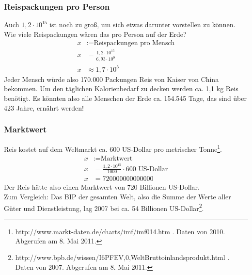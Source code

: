 \documentclass[a4paper,9pt]{scrartcl}
\begin{document}
  \subsubsection{Reispackungen pro Person}
    Auch $1,2 \cdot 10^{15}$ ist noch zu groß, um sich etwas darunter vorstellen
    zu können.\\
    Wie viele Reispackungen wären das pro Person auf der Erde?\\
    \begin{align}
        x &:= \text{Reispackungen pro Mensch} \\
        x &= \frac{1,2 \cdot 10^{15}}{6,93 \cdot 10^9} \\
        x &\approx 1,7 \cdot 10^5
    \end{align}
    Jeder Mensch würde also 170.000 Packungen Reis von Kaiser von China bekommen.
    Um den täglichen Kalorienbedarf zu decken werden ca. 1,1 kg Reis benötigt.
    Es könnten also alle Menschen der Erde ca. 154.545 Tage, das sind über 423
    Jahre, ernährt werden!\\
  \subsubsection{Marktwert}
    Reis kostet auf dem Weltmarkt ca. 600 US-Dollar pro metrischer Tonne\footnote{http://www.markt-daten.de/charts/imf/imf014.htm . Daten von 2010. Abgerufen am 8. Mai 2011.}.
    \begin{align}
        x &:= \text{Marktwert} \\
        x &= \frac{1,2 \cdot 10^{15}}{1000} \cdot 600 \text{ US-Dollar}\\
        x &= 720000000000000
    \end{align}
    Der Reis hätte also einen Marktwert von 720 Billionen US-Dollar. \\
    Zum Vergleich: Das BIP der
    gesamten Welt, also die Summe der Werte aller Güter und Dienstleistung, lag
    2007 bei ca. 54 Billionen US-Dollar\footnote{http://www.bpb.de/wissen/I6PFEV,0,WeltBruttoinlandsprodukt.html . Daten von 2007. Abgerufen am 8. Mai 2011.}.
\end{document}
